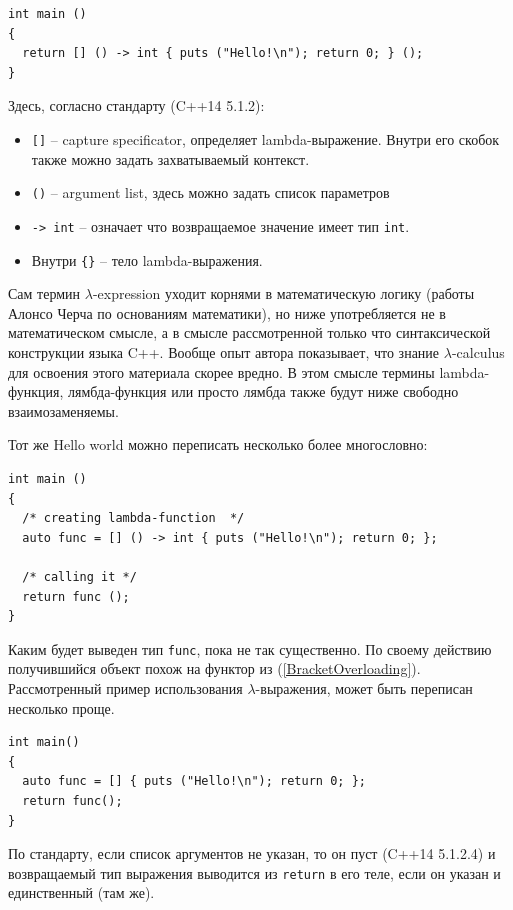 \documentclass[a4paper,12pt,oneside]{article}
\begin{document}
\begin{lstlisting}
int main ()
{
  return [] () -> int { puts ("Hello!\n"); return 0; } (); 
}
\end{lstlisting}

Здесь, согласно стандарту (C++14 5.1.2): 

\begin{itemize}
\item \lstinline![]! -- capture specificator, определяет lambda-выражение. Внутри его скобок также можно задать захватываемый контекст.

\item \lstinline!()! -- argument list, здесь можно задать список параметров

\item \lstinline!-> int! -- означает что возвращаемое значение имеет тип \lstinline!int!.

\item Внутри \lstinline!{}! -- тело lambda-выражения.
\end{itemize}

Сам термин $\lambda$-expression уходит корнями в математическую логику (работы Алонсо Черча по основаниям математики), но ниже употребляется не в математическом смысле, а в смысле рассмотренной только что синтаксической конструкции языка C++. Вообще опыт автора показывает, что знание $\lambda$-calculus для освоения этого материала скорее вредно. В этом смысле термины lambda-функция, лямбда-функция или просто лямбда также будут ниже свободно взаимозаменяемы.

Тот же Hello world можно переписать несколько более многословно:

\begin{lstlisting}
int main ()
{
  /* creating lambda-function  */
  auto func = [] () -> int { puts ("Hello!\n"); return 0; };

  /* calling it */
  return func (); 
}
\end{lstlisting}


Каким будет выведен тип \lstinline!func!, пока не так существенно. По своему действию получившийся объект похож на функтор из (\ref{BracketOverloading}). Рассмотренный пример использования $\lambda$-выражения, может быть переписан несколько проще.

\begin{lstlisting}
int main()
{
  auto func = [] { puts ("Hello!\n"); return 0; };
  return func(); 
}
\end{lstlisting}

По стандарту, если список аргументов не указан, то он пуст (C++14 5.1.2.4) и возвращаемый тип выражения выводится из \lstinline!return! в его теле, если он указан и единственный (там же).
\end{document}
